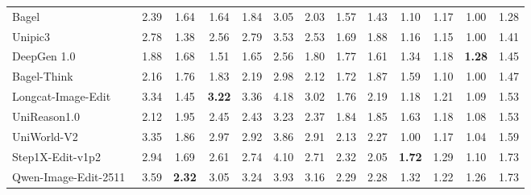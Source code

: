 \documentclass{llmxive}
\begin{document}
\begin{table}[t]
{\begin{tabular}{l|cccccc|cccccc}
            Bagel~\cite{deng2025emerging}
            & 2.39 & 1.64 & 1.64 & 1.84 & 3.05 & \cellcolor[HTML]{C8C8C8}2.03 & 1.57 & 1.43 & 1.10 & 1.17 & 1.00  
            & \cellcolor[HTML]{C8C8C8}1.28 \\

            Unipic3~\cite{wei2026skywork}
            & 2.78 & 1.38 & 2.56 & 2.79 & 3.53 & \cellcolor[HTML]{C8C8C8}2.53 & 1.69 & 1.88 & 1.16 & 1.15 & 1.00
            & \cellcolor[HTML]{C8C8C8}1.41 \\

            DeepGen 1.0~\cite{wang2026deepgen}
            & 1.88 & 1.68 & 1.51 & 1.65 & 2.56 & \cellcolor[HTML]{C8C8C8}1.80 & 1.77 & 1.61 & 1.34 & 1.18 & \textbf{1.28 }
            & \cellcolor[HTML]{C8C8C8}1.45 \\

            Bagel-Think~\cite{deng2025emerging}
            & 2.16 & 1.76 & 1.83 & 2.19 & 2.98 & \cellcolor[HTML]{C8C8C8}2.12  & 1.72 & 1.87 & 1.59 & 1.10 & 1.00
            & \cellcolor[HTML]{C8C8C8}1.47 \\

            Longcat-Image-Edit~\cite{team2025longcat}
            & 3.34 & 1.45 & \textbf{3.22} & 3.36 & 4.18 & \cellcolor[HTML]{C8C8C8}3.02 & 1.76 & 2.19 & 1.18 & 1.21 & 1.09
            & \cellcolor[HTML]{C8C8C8}1.53 \\

            UniReason1.0~\cite{wang2026unireason}
            & 2.12 & 1.95 & 2.45 & 2.43 & 3.23 & \cellcolor[HTML]{C8C8C8}2.37 & 1.84 & 1.85 & 1.63 & 1.18 & 1.08
            & \cellcolor[HTML]{C8C8C8}1.53 \\

            UniWorld-V2~\cite{li2025uniworld}
            & 3.35 & 1.86 & 2.97 & 2.92 & 3.86 & \cellcolor[HTML]{C8C8C8}2.91 & 2.13 & 2.27 & 1.00 & 1.17 & 1.04
            & \cellcolor[HTML]{C8C8C8}1.59 \\

            Step1X-Edit-v1p2~\cite{liu2025step1x}
            & 2.94 & 1.69 & 2.61 & 2.74 & 4.10 & \cellcolor[HTML]{C8C8C8}2.71 & 2.32 & 2.05 & \textbf{1.72} & 1.29 & 1.10
            & \cellcolor[HTML]{C8C8C8}1.73 \\

            Qwen-Image-Edit-2511~\cite{wu2025qwen}
            & 3.59  & \textbf{2.32} & 3.05 & 3.24 & 3.93 & \cellcolor[HTML]{C8C8C8}3.16 & 2.29 & 2.28 & 1.32 & 1.22 & 1.26
            & \cellcolor[HTML]{C8C8C8}1.73 \\



\end{tabular}}
\end{table}
\end{document}

